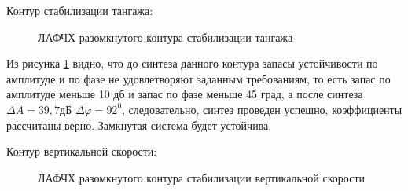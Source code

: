 \begin{center}
    Контур стабилизации тангажа:
\end{center}

\begin{figure}[H]
    \caption{ЛАФЧХ разомкнутого контура стабилизации тангажа}
    \label{fig:Тангаж раз qMIN}
\end{figure}

Из рисунка \ref{fig:Тангаж раз qMIN} видно, что до синтеза данного контура запасы устойчивости по амплитуде и по фазе не удовлетворяют заданным требованиям, то есть запас по амплитуде меньше 10 дб и запас по фазе меньше 45 град, а после синтеза $\Delta A = 39,7 $дБ $\Delta \varphi = 92^0$, следовательно, синтез проведен успешно, коэффициенты рассчитаны верно. Замкнутая система будет устойчива.  

\begin{center}
    Контур вертикальной скорости:
\end{center}

\begin{figure}[H]
    \caption{ЛАФЧХ разомкнутого контура стабилизации вертикальной скорости}
    \label{fig:Вертикальная скорость раз qMIN}
\end{figure}

